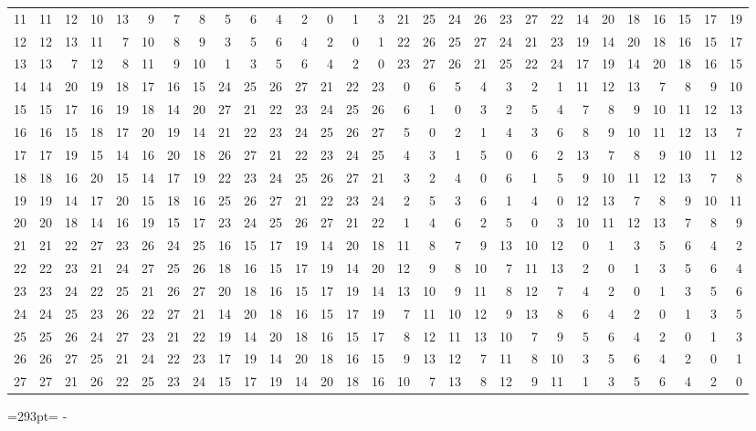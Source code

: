 \documentclass[10pt,a4paper]{article}
\newcommand{\needspace}[1]{\par\penalty-100\begingroup\dimen0=#1\relax\dimen2=\pagegoal
  \advance\dimen2-\pagetotal\ifdim\dimen0>\dimen2\relax\ifdim\dimen2>0pt\vfil\break\fi\fi
  \endgroup}
\numberwithin{equation}{section}
\begin{document}
{\begin{longtable}{@{}r|rrrrrrrrrrrrrrrrrrrrrrrrrrrr@{}}
11 & 11 & 12 & 10 & 13 & 9 & 7 & 8 & 5 & 6 & 4 & 2 & 0 & 1 & 3 & 21 & 25 & 24 & 26 & 23 & 27 & 22 & 14 & 20 & 18 & 16 & 15 & 17 & 19\\
12 & 12 & 13 & 11 & 7 & 10 & 8 & 9 & 3 & 5 & 6 & 4 & 2 & 0 & 1 & 22 & 26 & 25 & 27 & 24 & 21 & 23 & 19 & 14 & 20 & 18 & 16 & 15 & 17\\
13 & 13 & 7 & 12 & 8 & 11 & 9 & 10 & 1 & 3 & 5 & 6 & 4 & 2 & 0 & 23 & 27 & 26 & 21 & 25 & 22 & 24 & 17 & 19 & 14 & 20 & 18 & 16 & 15\\
14 & 14 & 20 & 19 & 18 & 17 & 16 & 15 & 24 & 25 & 26 & 27 & 21 & 22 & 23 & 0 & 6 & 5 & 4 & 3 & 2 & 1 & 11 & 12 & 13 & 7 & 8 & 9 & 10\\
15 & 15 & 17 & 16 & 19 & 18 & 14 & 20 & 27 & 21 & 22 & 23 & 24 & 25 & 26 & 6 & 1 & 0 & 3 & 2 & 5 & 4 & 7 & 8 & 9 & 10 & 11 & 12 & 13\\
16 & 16 & 15 & 18 & 17 & 20 & 19 & 14 & 21 & 22 & 23 & 24 & 25 & 26 & 27 & 5 & 0 & 2 & 1 & 4 & 3 & 6 & 8 & 9 & 10 & 11 & 12 & 13 & 7\\
17 & 17 & 19 & 15 & 14 & 16 & 20 & 18 & 26 & 27 & 21 & 22 & 23 & 24 & 25 & 4 & 3 & 1 & 5 & 0 & 6 & 2 & 13 & 7 & 8 & 9 & 10 & 11 & 12\\
18 & 18 & 16 & 20 & 15 & 14 & 17 & 19 & 22 & 23 & 24 & 25 & 26 & 27 & 21 & 3 & 2 & 4 & 0 & 6 & 1 & 5 & 9 & 10 & 11 & 12 & 13 & 7 & 8\\
19 & 19 & 14 & 17 & 20 & 15 & 18 & 16 & 25 & 26 & 27 & 21 & 22 & 23 & 24 & 2 & 5 & 3 & 6 & 1 & 4 & 0 & 12 & 13 & 7 & 8 & 9 & 10 & 11\\
20 & 20 & 18 & 14 & 16 & 19 & 15 & 17 & 23 & 24 & 25 & 26 & 27 & 21 & 22 & 1 & 4 & 6 & 2 & 5 & 0 & 3 & 10 & 11 & 12 & 13 & 7 & 8 & 9\\
21 & 21 & 22 & 27 & 23 & 26 & 24 & 25 & 16 & 15 & 17 & 19 & 14 & 20 & 18 & 11 & 8 & 7 & 9 & 13 & 10 & 12 & 0 & 1 & 3 & 5 & 6 & 4 & 2\\
22 & 22 & 23 & 21 & 24 & 27 & 25 & 26 & 18 & 16 & 15 & 17 & 19 & 14 & 20 & 12 & 9 & 8 & 10 & 7 & 11 & 13 & 2 & 0 & 1 & 3 & 5 & 6 & 4\\
23 & 23 & 24 & 22 & 25 & 21 & 26 & 27 & 20 & 18 & 16 & 15 & 17 & 19 & 14 & 13 & 10 & 9 & 11 & 8 & 12 & 7 & 4 & 2 & 0 & 1 & 3 & 5 & 6\\
24 & 24 & 25 & 23 & 26 & 22 & 27 & 21 & 14 & 20 & 18 & 16 & 15 & 17 & 19 & 7 & 11 & 10 & 12 & 9 & 13 & 8 & 6 & 4 & 2 & 0 & 1 & 3 & 5\\
25 & 25 & 26 & 24 & 27 & 23 & 21 & 22 & 19 & 14 & 20 & 18 & 16 & 15 & 17 & 8 & 12 & 11 & 13 & 10 & 7 & 9 & 5 & 6 & 4 & 2 & 0 & 1 & 3\\
26 & 26 & 27 & 25 & 21 & 24 & 22 & 23 & 17 & 19 & 14 & 20 & 18 & 16 & 15 & 9 & 13 & 12 & 7 & 11 & 8 & 10 & 3 & 5 & 6 & 4 & 2 & 0 & 1\\*
27 & 27 & 21 & 26 & 22 & 25 & 23 & 24 & 15 & 17 & 19 & 14 & 20 & 18 & 16 & 10 & 7 & 13 & 8 & 12 & 9 & 11 & 1 & 3 & 5 & 6 & 4 & 2 & 0\\
\bottomrule\end{longtable}}
\needspace{293pt}
\end{document}
